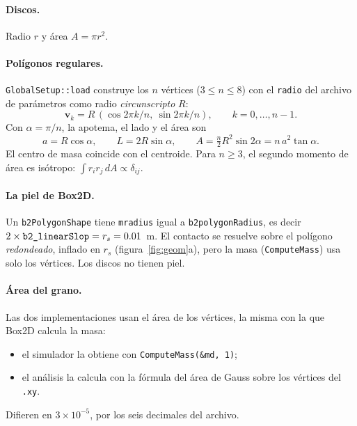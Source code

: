 \documentclass[11pt,a4paper]{article}
\newcommand{\vect}[1]{\mathbf{#1}}
\newcommand{\codeus}{\textunderscore\allowbreak}
\newcommand{\code}[1]{\texttt{\begingroup\let\_\codeus#1\endgroup}}
\begin{document}
\paragraph{Discos.} Radio $r$ y área $A = \pi r^2$.

\paragraph{Polígonos regulares.} \code{GlobalSetup::load} construye los
$n$ vértices ($3 \le n \le 8$) con el \code{radio} del archivo de
parámetros como radio \emph{circunscripto} $R$:
\begin{equation}
  \vect{v}_k = R\,(\cos 2\pi k/n,\ \sin 2\pi k/n), \qquad k = 0,\dots,n-1.
\end{equation}
Con $\alpha = \pi/n$, la apotema, el lado y el área son
\begin{equation}
  a = R\cos\alpha, \qquad L = 2R\sin\alpha, \qquad
  A = \tfrac{n}{2}R^2\sin 2\alpha = n\,a^2\tan\alpha .
\end{equation}
El centro de masa coincide con el centroide. Para $n \ge 3$, el segundo
momento de área es isótropo: $\int r_i r_j\,dA \propto \delta_{ij}$.

\paragraph{La piel de Box2D.} Un \code{b2PolygonShape} tiene
\code{m\_radius} igual a \code{b2\_polygonRadius}, es decir
$2\times\code{b2\_linearSlop} = r_s = 0.01$~m. El contacto se resuelve
sobre el polígono \emph{redondeado}, inflado en $r_s$
(figura~\ref{fig:geom}a), pero la masa (\code{ComputeMass}) usa solo los
vértices. Los discos no tienen piel.

\paragraph{Área del grano.} Las dos implementaciones usan el área de los
vértices, la misma con la que Box2D calcula la masa:
\begin{itemize}
  \item el simulador la obtiene con \code{ComputeMass(\&md, 1)};
  \item el análisis la calcula con la fórmula del área de Gauss sobre los
    vértices del \code{.xy}.
\end{itemize}
Difieren en $3\times10^{-5}$, por los seis decimales del archivo.
\end{document}
